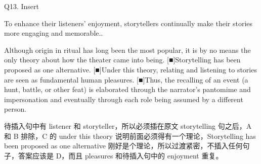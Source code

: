 \begin{blk}
    \begin{qst}
        Q13. Insert
    \end{qst}

    \begin{chc}
        To enhance their listeners’ enjoyment, storytellers continually make their stories more engaging and memorable..
    \end{chc}

    \begin{psgq}
        [■]Although origin in ritual has long been the most popular, it is by no means the only theory about how the theater came into being. [■]Storytelling has been proposed as one alternative. [■]Under this theory, relating and listening to stories are seen as fundamental human pleasures. [■]Thus, the recalling of an event (a hunt, battle, or other feat) is elaborated through the narrator’s pantomime and impersonation and eventually through each role being assumed by a different person.
    \end{psgq}

    \begin{nlz}
        待插入句中有 listener 和 storyteller，所以必须插在原文 storytelling 句之后，A 和 B 排除，C 的 under this theory 说明前面必须得有一个理论，Storytelling has been proposed as one alternative 刚好是个理论，所以过渡紧密，不插入任何句子，答案应该是 D，而且 pleasures 和待插入句中的 enjoyment 重复。
    \end{nlz}
\end{blk}

